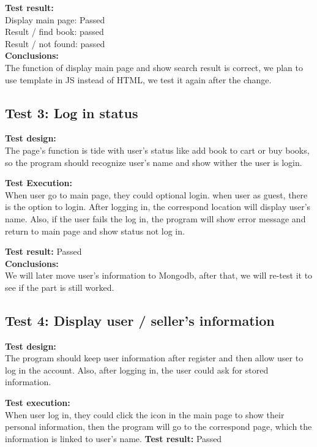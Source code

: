 \documentclass[12pt]{article}
\begin{document}
	\textbf{Test result: }\\
			Display main page: Passed \\
          	Result / find book: passed \\
          	Result / not found: passed \\

	\textbf{Conclusions:} \\
	The function of display main page and show search result is correct, we plan to use template in JS instead of HTML, we test it again after the change.


	\subsection{Test 3: Log in status}

	\textbf{Test design:} \\
	The page’s function is tide with user’s status like add book to cart or buy books, so the program should recognize user’s name and show wither the user is login.

	\textbf{Test Execution: } \\
	When user go to main page, they could optional login. when user as guest, there is the option to login. After logging in, the correspond location will display user’s name. Also, if the user fails the log in, the program will show error message and return to main page and show status not log in.

	\textbf{Test result: } Passed \\

	\textbf{Conclusions:} \\
	We will later move user’s information to Mongodb, after that, we will re-test it to see if the part is still worked.


	\subsection{Test 4: Display user / seller's information}

	\textbf{Test design:} \\
	The program should keep user information after register and then allow user to log in the account. Also, after logging in, the user could ask for stored information.

	\textbf{Test execution:} \\
	When user log in, they could click the icon in the main page to show their personal information, then the program will go to the correspond page, which the information is linked to user’s name.
	\textbf{Test result: } Passed \\
\end{document}
